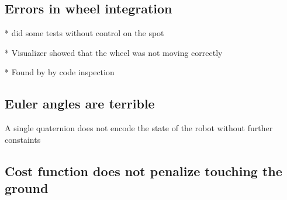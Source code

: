 \subsection{Errors in wheel integration}

* did some tests without control on the spot

* Visualizer showed that the wheel was not moving correctly

* Found by by code inspection

\subsection{Euler angles are terrible}

A single quaternion does not encode the state of the robot without further constaints


\subsection{Cost function does not penalize touching the ground}

